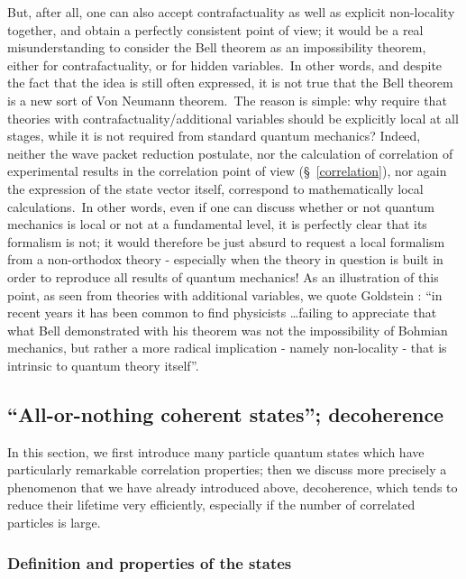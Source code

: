 \documentclass[12pt,onecolumn]{article}%
\begin{document}
But, after all, one can also accept contrafactuality as well as explicit
non-locality together, and obtain a perfectly consistent point of view; it
would be a real misunderstanding to consider the Bell theorem as an
impossibility theorem, either for contrafactuality, or for hidden
variables.\ In other words, and despite the fact that the idea is still often
expressed, it is not true that the Bell theorem is a new sort of Von Neumann
theorem.\ The reason is simple: why require that theories with
contrafactuality/additional variables should be explicitly local at all
stages, while it is not required from standard quantum mechanics? Indeed,
neither the wave packet reduction postulate, nor the calculation of
correlation of experimental results in the correlation point of view
(\S \ \ref{correlation}), nor again the expression of the state vector itself,
correspond to mathematically local calculations.\ In other words, even if one
can discuss whether or not quantum mechanics is local or not at a fundamental
level, it is perfectly clear that its formalism is not; it would therefore be
just absurd to request a local formalism from a non-orthodox theory -
especially when the theory in question is built in order to reproduce all
results of quantum mechanics! As an illustration of this point, as seen from
theories with additional variables, we quote Goldstein \cite{Goldstein}: ``in
recent years it has been common to find physicists \ldots  failing to appreciate
that what Bell demonstrated with his theorem was not the impossibility of
Bohmian mechanics, but rather a more radical implication - namely non-locality
- that is intrinsic to quantum theory itself''.

\subsection{``All-or-nothing coherent states''; decoherence}

In this section, we first introduce many particle quantum states which have
particularly remarkable correlation properties; then we discuss more precisely
a phenomenon that we have already introduced above, decoherence, which tends
to reduce their lifetime very efficiently, especially if the number of
correlated particles is large.

\subsubsection{Definition and properties of the states}
\end{document}
